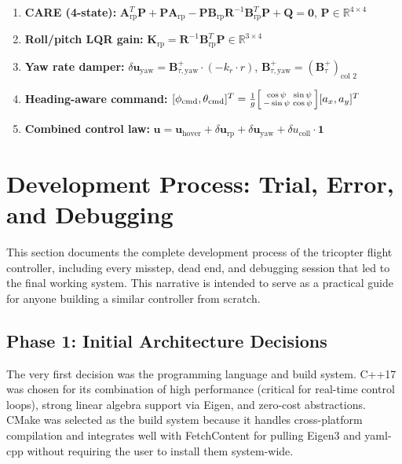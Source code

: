 \documentclass[12pt, a4paper]{article}
\newcommand{\R}{\mathbb{R}}
\newcommand{\bu}{\bm{u}}
\newcommand{\bK}{\bm{K}}
\newcommand{\bA}{\bm{A}}
\newcommand{\bB}{\bm{B}}
\newcommand{\bP}{\bm{P}}
\newcommand{\bQ}{\bm{Q}}
\newcommand{\bR}{\bm{R}}
\newcommand{\bzero}{\bm{0}}
\begin{document}
\begin{enumerate}
    \item \textbf{CARE (4-state):} $\bA_{\text{rp}}^T\bP + \bP\bA_{\text{rp}} - \bP\bB_{\text{rp}}\bR^{-1}\bB_{\text{rp}}^T\bP + \bQ = \bzero$, \; $\bP \in \R^{4 \times 4}$

    \item \textbf{Roll/pitch LQR gain:} $\bK_{\text{rp}} = \bR^{-1}\bB_{\text{rp}}^T\bP \in \R^{3 \times 4}$

    \item \textbf{Yaw rate damper:} $\delta\bu_{\text{yaw}} = \bB_{\tau,\text{yaw}}^+ \cdot (-k_r \cdot r)$, \; $\bB_{\tau,\text{yaw}}^+ = (\bB_\tau^+)_{\text{col 2}}$

    \item \textbf{Heading-aware command:} $[\phi_{\text{cmd}}, \theta_{\text{cmd}}]^T = \frac{1}{g} \begin{bsmallmatrix} \cos\psi & \sin\psi \\ -\sin\psi & \cos\psi \end{bsmallmatrix} [a_x, a_y]^T$

    \item \textbf{Combined control law:} $\bu = \bu_{\text{hover}} + \delta\bu_{\text{rp}} + \delta\bu_{\text{yaw}} + \delta u_{\text{coll}} \cdot \bm{1}$
\end{enumerate}

\section{Development Process: Trial, Error, and Debugging}
\label{sec:dev_process}

This section documents the complete development process of the tricopter flight controller, including every misstep, dead end, and debugging session that led to the final working system.  This narrative is intended to serve as a practical guide for anyone building a similar controller from scratch.

\subsection{Phase 1: Initial Architecture Decisions}

The very first decision was the programming language and build system.  C++17 was chosen for its combination of high performance (critical for real-time control loops), strong linear algebra support via Eigen, and zero-cost abstractions.  CMake was selected as the build system because it handles cross-platform compilation and integrates well with FetchContent for pulling Eigen3 and yaml-cpp without requiring the user to install them system-wide.
\end{document}

